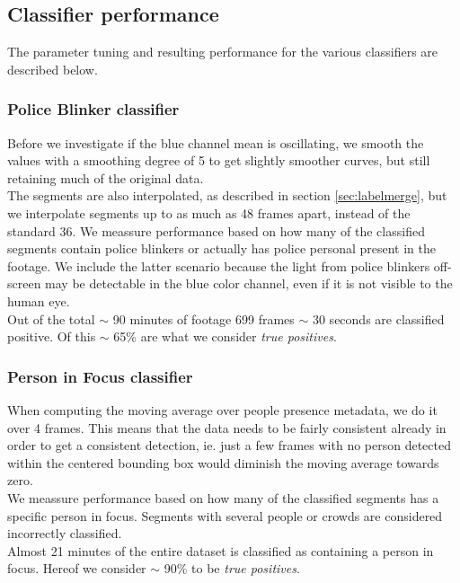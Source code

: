 \subsection{Classifier performance}
%
The parameter tuning and resulting performance for the various classifiers are described below.
%
\subsubsection{Police Blinker classifier}
%
Before we investigate if the blue channel mean is oscillating, we smooth the values with a smoothing degree of 5 to get slightly smoother curves, but still retaining much of the original data.\\
The segments are also interpolated, as described in section \ref{sec:labelmerge}, but we interpolate segments up to as much as 48 frames apart, instead of the standard 36.
%
We meassure performance based on how many of the classified segments contain police blinkers or actually has police personal present in the footage. We include the latter scenario because the light from police blinkers off-screen may be detectable in the blue color channel, even if it is not visible to the human eye.\\
Out of the total $\sim$ 90 minutes of footage 699 frames $\sim$ 30 seconds are classified positive. Of this $\sim$ 65\% are what we consider \textit{true positives}.
%
\subsubsection{Person in Focus classifier}
%
When computing the moving average over people presence metadata, we do it over 4 frames. This means that the data needs to be fairly consistent already in order to get a consistent detection, ie. just a few frames with no person detected within the centered bounding box would diminish the moving average towards zero.\\
%
We meassure performance based on how many of the classified segments has a specific person in focus. Segments with several people or crowds are considered incorrectly classified.\\
Almost 21 minutes of the entire dataset is classified as containing a person in focus. Hereof we consider $\sim$ 90\% to be \textit{true positives}.
%
